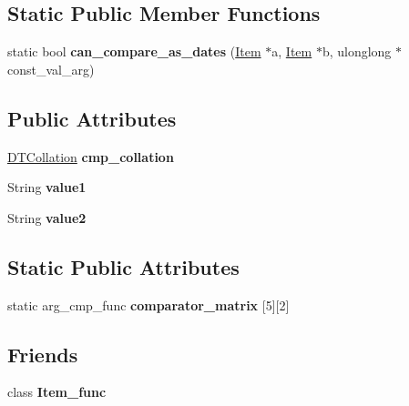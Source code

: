 \subsection*{Static Public Member Functions}
\begin{DoxyCompactItemize}
\item 
\mbox{\label{classArg__comparator_a952169cba8fef2474da03956cb932634}} 
static bool {\bfseries can\+\_\+compare\+\_\+as\+\_\+dates} (\mbox{\hyperlink{classItem}{Item}} $\ast$a, \mbox{\hyperlink{classItem}{Item}} $\ast$b, ulonglong $\ast$const\+\_\+val\+\_\+arg)
\end{DoxyCompactItemize}
\subsection*{Public Attributes}
\begin{DoxyCompactItemize}
\item 
\mbox{\label{classArg__comparator_af0c1250b26447573763c059a871eb68c}} 
\mbox{\hyperlink{classDTCollation}{D\+T\+Collation}} {\bfseries cmp\+\_\+collation}
\item 
\mbox{\label{classArg__comparator_a35a06ca24c91c81976d0e4f3bc82b418}} 
String {\bfseries value1}
\item 
\mbox{\label{classArg__comparator_a744d453b24b980923d847a985130bf17}} 
String {\bfseries value2}
\end{DoxyCompactItemize}
\subsection*{Static Public Attributes}
\begin{DoxyCompactItemize}
\item 
static arg\+\_\+cmp\+\_\+func {\bfseries comparator\+\_\+matrix} \mbox{[}5\mbox{]}\mbox{[}2\mbox{]}
\end{DoxyCompactItemize}
\subsection*{Friends}
\begin{DoxyCompactItemize}
\item 
\mbox{\label{classArg__comparator_adcfaf6eb53d77265df7d807ec807f901}} 
class {\bfseries Item\+\_\+func}
\end{DoxyCompactItemize}


